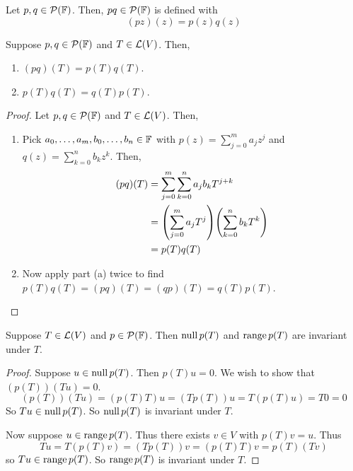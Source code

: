 \begin{definition}
    Let $p,q\in\mathcal{P}(\mathbb F)$. Then, $pq\in\mathcal{P}(\mathbb F)$ is defined with
    \[ (pz)(z) = p(z)q(z) \]
\end{definition}
\begin{theorem}
    Suppose $p,q\in\mathcal{P}(\mathbb F)$ and $T\in\mathcal{L}(V)$. Then,
    \begin{enumerate}
        \item $(pq)(T) = p(T)q(T)$.
        \item $p(T)q(T) = q(T)p(T)$.
    \end{enumerate}
\end{theorem}
\begin{proof}
Let $p,q\in\mathcal{P}(\mathbb F)$ and $T\in\mathcal{L}(V)$. Then, 
    \begin{enumerate}
        \item Pick $a_0, \dots, a_m, b_0, \dots, b_n \in \mathbb F$ with $p(z) = \sum_{j=0}^m a_jz^j$ and $q(z) = \sum_{k=0}^n b_kz^k$. Then,
        \begin{align*}
            (pq)(T) &= \sum_{j=0}^m \sum_{k=0}^n a_j b_k T^{j+k} \\
            &= \pqty{\sum_{j=0}^m a_jT^j}\pqty{\sum_{k=0}^n b_kT^k} \\
            &= p(T)q(T)
        \end{align*}
        \item Now apply part (a) twice to find $p(T)q(T) = (pq)(T) = (qp)(T) = q(T)p(T)$.
    \end{enumerate}
\end{proof}
\begin{theorem}
    Suppose $T\in\mathcal{L}(V)$ and $p\in\mathcal{P}(\mathbb F)$. Then $\operatorname{null} p(T)$ and $\operatorname{range} p(T)$ are invariant under $T$.
\end{theorem}
\begin{proof}
    Suppose $u\in \operatorname{null} p(T)$. Then $p(T)u = 0$. We wish to show that $(p(T))(Tu) = 0$.
    \[ (p(T))(Tu) = (p(T)T)u = (Tp(T))u = T(p(T)u) = T0 = 0\]
    So $Tu \in \operatorname{null} p(T)$. So $\operatorname{null} p(T)$ is invariant under $T$.

    Now suppose $u\in\operatorname{range} p(T)$. Thus there exists $v\in V$ with $p(T)v = u$. Thus
    \[ Tu = T(p(T)v) = (Tp(T))v = (p(T)T)v = p(T)(Tv)\]
    so $Tu\in \operatorname{range} p(T)$. So $\operatorname{range} p(T)$ is invariant under $T$.
\end{proof}